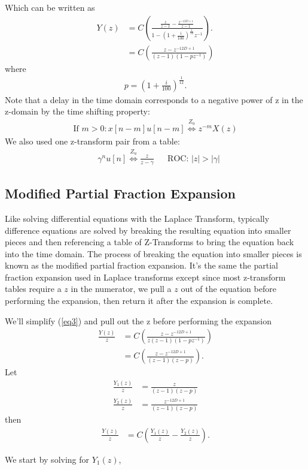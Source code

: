 \documentclass[letterpaper]{article}
\begin{document}
Which can be written as
\begin{align}
	Y(z) &=  C\left(\frac{\frac{z}{z-1} - \frac{z^{-12D+1}}{z-1}}
	{1 - \left(1 + \frac{i}{100} \right)^{\frac{1}{12}}z^{-1}}\right). \label{eq3} \\
	     &=  C\left(\frac{z - z^{-12D+1}}{(z-1)(1 - p z^{-1})}\right)
\end{align}
where 
\begin{align}
	p = \left(1 + \frac{i}{100} \right)^{\frac{1}{12}}.
\end{align}
Note that a delay in the time domain corresponds to a negative power of z in the z-domain by the time shifting property:
\begin{align}
	\text{If }m>0: x[n-m]u[n-m] \stackrel{Z_u}{\Longleftrightarrow} z^{-m} X(z)
\end{align}
We also used one z-transform pair from a table:
\begin{align}
	&\gamma^nu[n] \stackrel{Z_u}{\Longleftrightarrow} \frac{z}{z-\gamma} & &\text{ROC: } |z|>|\gamma|
\end{align}

\subsection{Modified Partial Fraction Expansion}
Like solving differential equations with the Laplace Transform, typically difference equations are solved by breaking the resulting equation into smaller pieces and then referencing a table of Z-Transforms to bring the equation back into the time domain. The process of breaking the equation into smaller pieces is known as the modified partial fraction expansion. It's the same the partial fraction expansion used in Laplace transforms except since most z-transform tables require a $z$ in the numerator, we pull a $z$ out of the equation before performing the expansion, then return it after the expansion is complete.

We'll simplify (\ref{eq3}) and pull out the z before performing the expansion
\begin{align}
	\frac{Y(z)}{z} &= C \left( \frac{z - z^{-12D+1}}{z(z-1)(1 - pz^{-1})} \right) \\
	&= C \left( \frac{z - z^{-12D+1}}{(z-1)(z - p)} \right).
\end{align}
Let
\begin{align}
	\frac{Y_1(z)}{z} &= \frac{z}{(z-1)(z - p)} \\
	\frac{Y_2(z)}{z} &= \frac{z^{-12D+1}}{(z-1)(z - p)}
\end{align}
then
\begin{align}
	\frac{Y(z)}{z} &= C \left( \frac{Y_1(z)}{z} - \frac{Y_2(z)}{z} \right).
\end{align}

We start by solving for $Y_1(z)$,
\end{document}
